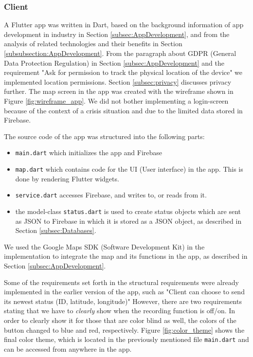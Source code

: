 \documentclass{article}
\begin{document}
\subsubsection{Client}
A Flutter app was written in Dart, based on the background information of app development in industry in Section \ref{subsec:AppDevelopment}, and from the analysis of related technologies and their benefits in Section \ref{subsubsection:AppDevelopment}. From the paragraph about GDPR (General Data Protection Regulation) in Section \ref{subsec:AppDevelopment} and the requirement "Ask for permission to track the physical location of the device" we implemented location permissions. Section \ref{subsec:privacy} discusses privacy further. The map screen in the app was created with the wireframe shown in Figure \ref{fig:wireframe_app}. We did not bother implementing a login-screen because of the context of a crisis situation and due to the limited data stored in Firebase.

The source code of the app was structured into the following parts: 
\begin{itemize}
    \item \verb|main.dart| which initializes the app and Firebase
    \item \verb|map.dart| which contains code for the UI (User interface) in the app. This is done by rendering Flutter widgets.
    \item \verb|service.dart| accesses Firebase, and writes to, or reads from it.
    \item the model-class \verb|status.dart| is used to create status objects which are sent as JSON to Firebase in which it is stored as a JSON object, as described in Section \ref{subsec:Databases}.
\end{itemize}
We used the Google Maps SDK (Software Development Kit) in the implementation to integrate the map and its functions in the app, as described in Section \ref{subsec:AppDevelopment}.

Some of the requirements set forth in the structural requirements were already implemented in the earlier version of the app, such as "Client can choose to send its newest status (ID, latitude, longitude)" However, there are two requirements stating that we have to \emph{clearly} show when the recording function is off/on. In order to clearly show it for those that are color blind as well, the colors of the button changed to blue and red, respectively. Figure \ref{fig:color_theme} shows the final color theme, which is located in the previously mentioned file \verb|main.dart| and can be accessed from anywhere in the app. 
\end{document}
